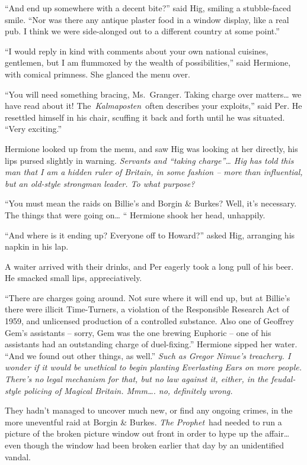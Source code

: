 ``And end up somewhere with a decent bite?'' said Hig, smiling a
stubble-faced smile. ``Nor was there any antique plaster food in a
window display, like a real pub. I think we were side-alonged out to a
different country at some point.''

``I would reply in kind with comments about your own national cuisines,
gentlemen, but I am flummoxed by the wealth of possibilities,'' said
Hermione, with comical primness. She glanced the menu over.

``You will need something bracing, Ms.~Granger. Taking charge over
matters\ldots{} we have read about it! The~\emph{Kalmaposten}~often
describes your exploits,'' said Per. He resettled himself in his chair,
scuffing it back and forth until he was situated. ``Very exciting.''

Hermione looked up from the menu, and saw Hig was looking at her
directly, his lips pursed slightly in warning. \emph{Servants and
``taking charge''\ldots{} Hig has told this man that I am a hidden ruler
of Britain, in some fashion -- more than influential, but an old-style
strongman leader. To what purpose?}

``You must mean the raids on Billie's and Borgin \& Burkes? Well, it's
necessary. The things that were going on\ldots{} `` Hermione shook her
head, unhappily.

``And where is it ending up? Everyone off to Howard?'' asked Hig,
arranging his napkin in his lap.

A waiter arrived with their drinks, and Per eagerly took a long pull of
his beer. He smacked small lips, appreciatively.

``There are charges going around. Not sure where it will end up, but at
Billie's there were illicit Time-Turners, a violation of the Responsible
Research Act of 1959, and unlicensed production of a controlled
substance. Also one of Geoffrey Gem's assistants -- sorry, Gem was the
one brewing Euphoric -- one of his assistants had an outstanding charge
of duel-fixing.'' Hermione sipped her water. ``And we found out other
things, as well.'' \emph{Such as Gregor Nimue's treachery. I wonder if
it would be unethical to begin planting Everlasting Ears on more people.
There's no legal mechanism for that, but no law against it, either, in
the feudal-style policing of Magical Britain. Mmm\ldots. no, definitely
wrong.}

They hadn't managed to uncover much new, or find any ongoing crimes, in
the more uneventful raid at Borgin \& Burkes. \emph{The Prophet}~had
needed to run a picture of the broken picture window out front in order
to hype up the affair\ldots{} even though the window had been broken
earlier that day by an unidentified vandal.

